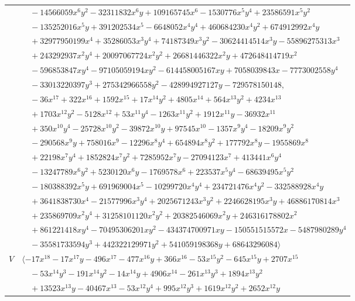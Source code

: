 \documentclass[11pt]{article}
\begin{document}
\begin{longtable}{@{}ll@{}}
 & $\quad -14566059x^{6}y^{2}-32311832x^{6}y+109165745x^{6}-1530776x^{5}y^{4}+23586591x^{5}y^{2}$\\
 & $\quad -135252016x^{5}y+391202534x^{5}-6648052x^{4}y^{4}+460684230x^{4}y^{2}+674912992x^{4}y$\\
 & $\quad +32977950199x^{4}+35286053x^{3}y^{4}+74187349x^{3}y^{2}-30624414514x^{3}y-55896275313x^{3}$\\
 & $\quad +243292937x^{2}y^{4}+20097067724x^{2}y^{2}+26681446322x^{2}y+472648414719x^{2}$\\
 & $\quad -596853847xy^{4}-97105059194xy^{2}-614458005167xy+7058039843x-7773002558y^{4}$\\
 & $\quad -33013220397y^{3}+275342966558y^{2}-428994927127y-729578150148,$\\
 & $\quad -36x^{17}+322x^{16}+1592x^{15}+17x^{14}y^{2}+4805x^{14}+564x^{13}y^{2}+4234x^{13}$\\
 & $\quad +1703x^{12}y^{2}-5128x^{12}+53x^{11}y^{4}-1263x^{11}y^{2}+1912x^{11}y-36932x^{11}$\\
 & $\quad +350x^{10}y^{4}-25728x^{10}y^{2}-39872x^{10}y+97545x^{10}-1357x^{9}y^{4}-18209x^{9}y^{2}$\\
 & $\quad -290568x^{9}y+758016x^{9}-12296x^{8}y^{4}+654894x^{8}y^{2}+177792x^{8}y-1955869x^{8}$\\
 & $\quad +22198x^{7}y^{4}+1852824x^{7}y^{2}+7285952x^{7}y-27094123x^{7}+413441x^{6}y^{4}$\\
 & $\quad -13247789x^{6}y^{2}+5230120x^{6}y-1769578x^{6}+223537x^{5}y^{4}-68639495x^{5}y^{2}$\\
 & $\quad -180388392x^{5}y+691969004x^{5}-10299720x^{4}y^{4}+234721476x^{4}y^{2}-332588928x^{4}y$\\
 & $\quad +3641838730x^{4}-21577996x^{3}y^{4}+2025671243x^{3}y^{2}+2246628195x^{3}y+46886170814x^{3}$\\
 & $\quad +235869709x^{2}y^{4}+31258101120x^{2}y^{2}+20382546069x^{2}y+246316178802x^{2}$\\
 & $\quad +861221418xy^{4}-70495306201xy^{2}-434374700971xy-150551515572x-5487980289y^{4}$\\
 & $\quad -35581733594y^{3}+442322129971y^{2}+541059198368y+68643296084\rangle$\\
$V$ & $\langle -17x^{18}-17x^{17}y-496x^{17}-477x^{16}y+366x^{16}-53x^{15}y^{2}-645x^{15}y+2707x^{15}$\\
 & $\quad -53x^{14}y^{3}-191x^{14}y^{2}-14x^{14}y+4906x^{14}-261x^{13}y^{3}+1894x^{13}y^{2}$\\
 & $\quad +13523x^{13}y-40467x^{13}-53x^{12}y^{4}+995x^{12}y^{3}+1619x^{12}y^{2}+2652x^{12}y$\\

\end{longtable}
\end{document}
